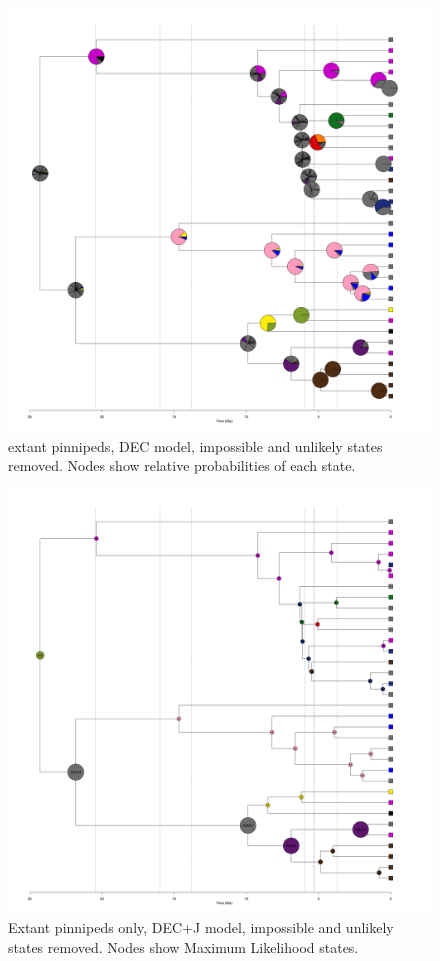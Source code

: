 \documentclass[a4paper, 12pt]{article}
\begin{document}
\begin{figure}[H]
 \centering
  \includegraphics[width = \linewidth]{figures/extant-pinnipeds-DEC-unlikely-pies.png}
  \caption{extant pinnipeds, DEC model, impossible and unlikely states removed. Nodes show relative probabilities of each state.}
  \label{fig-extant-dec-pie-unlikely}
\end{figure} 

\begin{figure}[H]
 \centering
  \includegraphics[width = \linewidth]{figures/extant-pinnipeds-DECj-unlikely-MLstates.png}
  \caption{Extant pinnipeds only, DEC+J model, impossible and unlikely states removed. Nodes show Maximum Likelihood states.}
  \label{fig-extant-decj-ml-unlikely}
\end{figure} 
\end{document}
